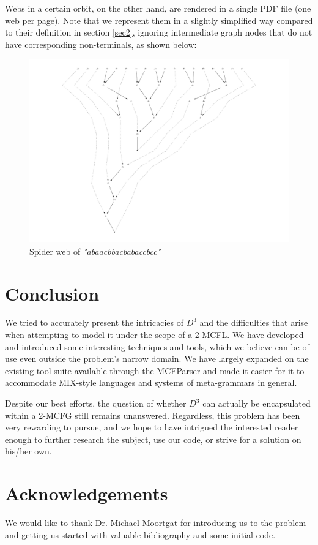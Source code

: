 \documentclass[nonatbib,numbers,10pt]{llncs}
\newcommand{\w}[1]{\textit{"#1"}}
\begin{document}
Webs in a certain orbit, on the other hand, are rendered in a single PDF file (one web per page). Note that we represent them in a slightly simplified way compared to their definition in section \ref{sec2}, ignoring intermediate graph nodes that do not have corresponding non-terminals, as shown below:
\medskip
\begin{figure}[h!]
\includegraphics[width=1.05\columnwidth]{web.pdf}
\caption{Spider web of \w{abaacbbacbabaccbcc}}
\end{figure}

\section{Conclusion}
We tried to accurately present the intricacies of $D^3$ and the difficulties that arise when attempting to model it under the scope of a 2-MCFL. We have developed and introduced some interesting techniques and tools, which we believe can be of use even outside the problem's narrow domain. We have largely expanded on the existing tool suite available through the MCFParser and made it easier for it to accommodate MIX-style languages and systems of meta-grammars in general. 

Despite our best efforts, the question of whether $D^3$ can actually be encapsulated within a 2-MCFG still remains unanswered. Regardless, this problem has been very rewarding to pursue, and we hope to have intrigued the interested reader enough to further research the subject, use our code, or strive for a solution on his/her own.

\section*{Acknowledgements}
We would like to thank Dr. Michael Moortgat for introducing us to the problem and getting us started with valuable bibliography and some initial code.




\end{document}
